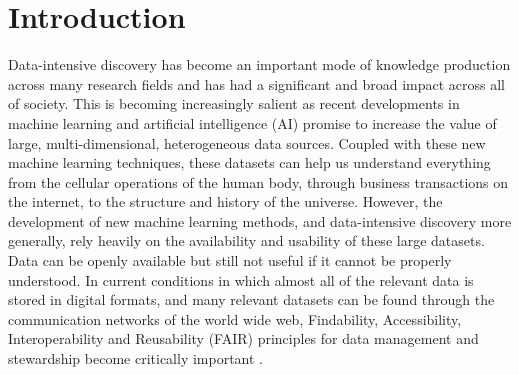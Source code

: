 \documentclass[
  letterpaper,
  DIV=11,
  numbers=noendperiod]{scrartcl}
\begin{document}
\section{Introduction}\label{introduction}

Data-intensive discovery has become an important mode of knowledge
production across many research fields and has had a significant and
broad impact across all of society. This is becoming increasingly
salient as recent developments in machine learning and artificial
intelligence (AI) promise to increase the value of large,
multi-dimensional, heterogeneous data sources. Coupled with these new
machine learning techniques, these datasets can help us understand
everything from the cellular operations of the human body, through
business transactions on the internet, to the structure and history of
the universe. However, the development of new machine learning methods,
and data-intensive discovery more generally, rely heavily on the
availability and usability of these large datasets. Data can be openly
available but still not useful if it cannot be properly understood. In
current conditions in which almost all of the relevant data is stored in
digital formats, and many relevant datasets can be found through the
communication networks of the world wide web, Findability,
Accessibility, Interoperability and Reusability (FAIR) principles for
data management and stewardship become critically important
\cite{Wilkinson2016FAIR}.
\end{document}
